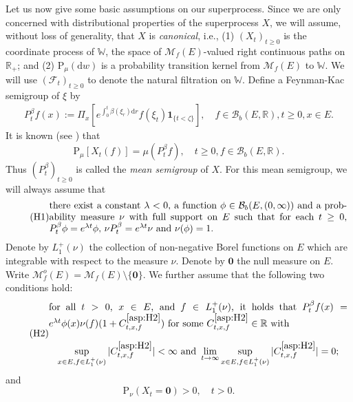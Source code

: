 \documentclass[12pt,a4paper]{amsart}
\numberwithin{equation}{section}
\theoremstyle{plain}
\theoremstyle{definition}
\theoremstyle{remark}
\begin{document}
	Let us now give some basic assumptions on our superprocess.
	Since we are only concerned with distributional properties of the superprocess $X$, we will assume, without loss of generality, that $X$ is \emph{canonical},  i.e.,
	(1) $(X_t)_{t\geq 0}$ is the coordinate process of
		$\mathbb W$,
		the space of $\mathcal M_f(E)$-valued right continuous paths on $\mathbb R_+$; and 
	(2) $\mathrm P_\mu(\mathrm dw)$ is a probability transition kernel from $\mathcal M_f(E)$ to $\mathbb W$.
	We will use $(\mathscr F_t)_{t\geq 0}$ to denote the natural filtration on $\mathbb W$.
	Define a Feynman-Kac semigroup of $\xi$ by
\begin{align}\label{eq:M.15}
	P_t^\beta f(x)
	:= \Pi_x[e^{\int_0^t \beta(\xi_r) {\mathrm d}r }f(\xi_t) \mathbf 1_{\{t < \zeta\}}],
	\quad f\in \mathcal B_b(E,\mathbb R), t\geq 0, x\in E.
\end{align}
	It is known (see \cite[Proposition 2.27]{Li2011Measure-valued}) that
\begin{equation} \label{eq:M.2}
	\mathrm P_\mu[X_t(f)] = \mu (P_t^\beta f),
	\quad t\geq 0, f \in \mathcal B_b(E,\mathbb R).
\end{equation}
	Thus $(P_t^\beta)_{t\geq 0}$ is called the \emph{mean semigroup}  of $X$.
	For this mean semigroup, we will always assume that
\begin{equation}\label{asp:H1} \tag{H1}
\begin{minipage}{0.9\textwidth}
	there exist a constant $\lambda < 0$, a function $\phi \in \mathcal B_b(E,(0,\infty))$ and a probability measure $\nu$ with full support on $E$ such that for each $t\geq 0$, $P_t^\beta \phi = e^{\lambda t} \phi$, $\nu P_t^\beta = e^{\lambda t} \nu$ and $\nu(\phi) =1$.
\end{minipage}
\end{equation}
	Denote by $L_1^+(\nu)$ the collection of non-negative Borel functions on $E$ which are integrable with respect to the measure $\nu$.
	Denote by $\mathbf 0$ the null measure on $E$.
	Write $\mathcal M_f^o(E) = \mathcal M_f(E)\setminus \{\mathbf 0\}$.
	We further assume that the following two conditions hold:
\begin{equation} \label{asp:H2} \tag{H2}
\begin{minipage}{0.9\textwidth}
	for all $t>0$, $x\in E$, and $f\in L_1^+(\nu)$, it holds that $P_t^\beta f(x) = e^{\lambda t} \phi(x) \nu(f) (1+ C^{\eqref{asp:H2}}_{t,x,f})$ for some $C^{\eqref{asp:H2}}_{t,x,f}\in \mathbb R$ with
\[
	\sup_{x\in E, f\in L_1^+(\nu)} |C^{\eqref{asp:H2}}_{t,x,f}|
	< \infty
	\text{ and }
	\lim_{t\to \infty} \sup_{x\in E, f\in L_1^+(\nu)} |C^{\eqref{asp:H2}}_{t,x,f}|
	= 0;
\]
\end{minipage}
\end{equation}
	and
\begin{equation} \label{asp:H3} \tag{H3}
	\mathrm P_\nu(X_t = \mathbf 0)>0, \quad t> 0.
\end{equation}
\end{document}
